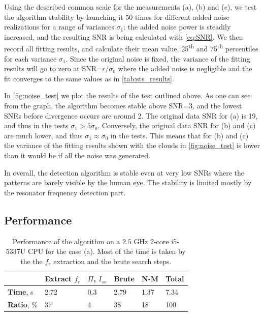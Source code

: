 \documentclass[%
 aip,
 draft,
 amsmath,amssymb,
 reprint,%
]{revtex4-1}
\begin{document}
Using the described common scale for the measurements (a), (b) and (c), we test the algorithm stability by launching it 50 times for different added noise realizations for a range of variances $\sigma_1$: the added noise power is steadily increased, and the resulting SNR is being calculated with \eqref{eq:SNR}. We then record all fitting results, and calculate their mean value, 25\textsuperscript{th} and 75\textsuperscript{th} percentiles for each variance $\sigma_1$.  Since the original noise is fixed, the variance of the fitting results will go to zero at SNR=$ r/\sigma_0 $ where the added noise is negligible and the fit converges to the same values as in \autoref{tab:sts_results}. 

In \autoref{fig:noise_test} we plot the results of the test outlined above. As one can see from the graph, the algorithm becomes stable above SNR=3, and the lowest SNRs before divergence occurs are around 2. The original data SNR for (a) is 19, and thus in the tests $\sigma_1 > 5\sigma_0$. Conversely, the original data SNR for (b) and (c) are much lower, and thus $\sigma_1 \approx \sigma_0$ in the tests. This means that for (b) and (c) the variance of the fitting results shown with the clouds in \autoref{fig:noise_test} is lower than it would be if all the noise was generated.

In overall, the detection algorithm is stable even at very low SNRs where the patterns are barely visible by the human eye. The stability is limited mostly by the resonator frequency detection part.


\subsection{Performance}


\begin{table}[b]
	\begin{ruledtabular}
		\begin{tabular}{llllll}
			&Extract $f_r$& $\Pi$, $I_{ss}$ & Brute &N-M &
			\textbf{Total}\\\hline
			\textbf{Time}, s& 2.72& 0.3&2.79&1.37&7.34\\
			\textbf{Ratio}, \% & 37 &4 &38 &18 &100
		\end{tabular}
	\end{ruledtabular}
	\caption{Performance of the algorithm on a 2.5 GHz 2-core i5-5337U CPU for the case (a). Most of the time is taken by the the $f_r$ extraction and the brute search steps.}
	\label{tab:performance}
\end{table}
\end{document}
